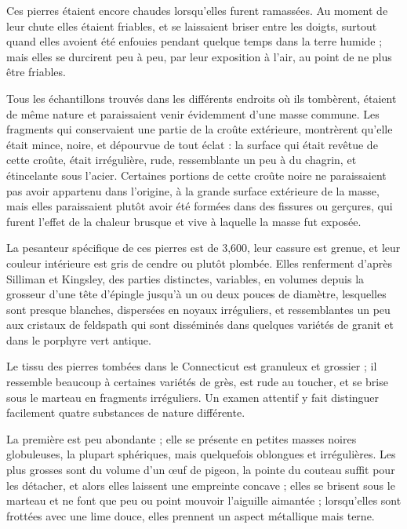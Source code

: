 \documentclass[a4paper, 12pt, oneside, french]{article}
\begin{document}
Ces pierres étaient encore chaudes lorsqu'elles furent ramassées. Au moment de leur chute elles étaient friables, et se laissaient briser entre les doigts, surtout quand elles avoient été enfouies pendant quelque temps dans la terre humide ; mais elles se durcirent peu à peu, par leur exposition à l'air, au point de ne plus être friables.

Tous les échantillons trouvés dans les différents endroits où ils tombèrent, étaient de même nature et paraissaient venir évidemment d'une masse commune. Les fragments qui conservaient une partie de la croûte extérieure, montrèrent qu'elle était mince, noire, et dépourvue de tout éclat : la surface qui était revêtue de cette croûte, était irrégulière, rude, ressemblante un peu à du chagrin, et étincelante sous l'acier. Certaines portions de cette croûte noire ne paraissaient pas avoir appartenu dans l'origine, à la grande surface extérieure de la masse, mais elles paraissaient plutôt avoir été formées dans des fissures ou gerçures, qui furent l'effet de la chaleur brusque et vive à laquelle la masse fut exposée.

La pesanteur spécifique de ces pierres est de 3,600, leur cassure est grenue, et leur couleur intérieure est gris de cendre ou plutôt plombée. Elles renferment d'après Silliman et Kingsley, des parties distinctes, variables, en volumes depuis la grosseur d'une tête d'épingle jusqu'à un ou deux pouces de diamètre, lesquelles sont presque blanches, dispersées en noyaux irréguliers, et ressemblantes un peu aux cristaux de feldspath qui sont disséminés dans quelques variétés de granit et dans le porphyre vert antique.

Le tissu des pierres tombées dans le Connecticut est granuleux et grossier ; il ressemble beaucoup à certaines variétés de grès, est rude au toucher, et se brise sous le marteau en fragments irréguliers. Un examen attentif y fait distinguer facilement quatre substances de nature différente.

La première est peu abondante ; elle se présente en petites masses noires globuleuses, la plupart sphériques, mais quelquefois oblongues et irrégulières. Les plus grosses sont du volume d'un œuf de pigeon, la pointe du couteau suffit pour les détacher, et alors elles laissent une empreinte concave ; elles se brisent sous le marteau et ne font que peu ou point mouvoir l'aiguille aimantée ; lorsqu'elles sont frottées avec une lime douce, elles prennent un aspect métallique mais terne.
\end{document}

